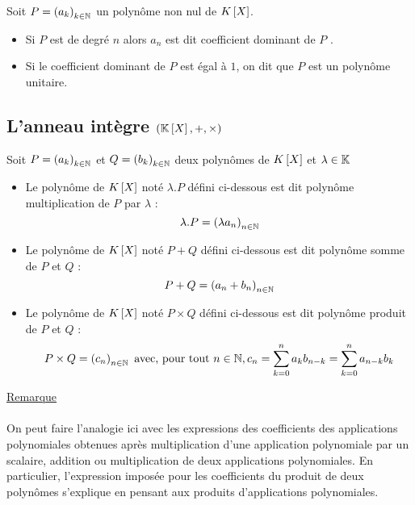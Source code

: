 \begin{defprop}
    Soit \(P = \left(a_k\right)_{k\in \mathbb{N}}\) un polynôme non nul de \(K\left[X\right]\).
    \begin{itemize}
        \item Si \(P\) est de degré \(n\) alors \(a_n\) est dit coefficient dominant de \(P\) .
        \item Si le coefficient dominant de \(P\) est égal à \(1\), on dit que \(P\) est un polynôme unitaire.
    \end{itemize}
\end{defprop}

\subsection{L’anneau intègre \(\left(\mathbb{K} \left[X\right] , +, \times\right)\)}

\begin{defprop}
    Soit \(P = \left(a_k\right)_{k\in \mathbb{N}}\) et \(Q = \left(b_k\right)_{k\in \mathbb{N}}\) deux polynômes de \(K\left[X\right]\) et \(\lambda \in \mathbb{K}\)
    \begin{itemize}
        \item Le polynôme de \(K\left[X\right]\) noté \(\lambda . P\) défini ci-dessous est dit polynôme multiplication de \(P\) par \(\lambda\) :
            \[\lambda . P = \left(\lambda a_n\right)_{n \in \mathbb{N}}\]
        \item Le polynôme de \(K\left[X\right]\) noté \(P + Q\) défini ci-dessous est dit polynôme somme de \(P\) et \(Q\) :
            \[P+Q = \left(a_n + b_n\right)_{n \in \mathbb{N}}\]
        \item Le polynôme de \(K\left[X\right]\) noté \(P \times Q\) défini ci-dessous est dit polynôme produit de \(P\) et \(Q\) :
            \[P \times Q = \left(c_n\right)_{n \in \mathbb{N}}\text{ avec, pour tout } n \in \mathbb{N}, c_n = \sum_{k=0}^{n} a_kb_{n-k} = \sum_{k=0}^n a_{n-k} b_k\]
    \end{itemize}
    \underline{Remarque}\\~\\ 
    On peut faire l’analogie ici avec les expressions des coefficients des applications polynomiales obtenues après multiplication d’une application polynomiale par un scalaire, addition ou multiplication de deux applications polynomiales. En particulier, l’expression imposée pour les coefficients du produit de deux polynômes s’explique en pensant aux produits d’applications polynomiales.
\end{defprop}



